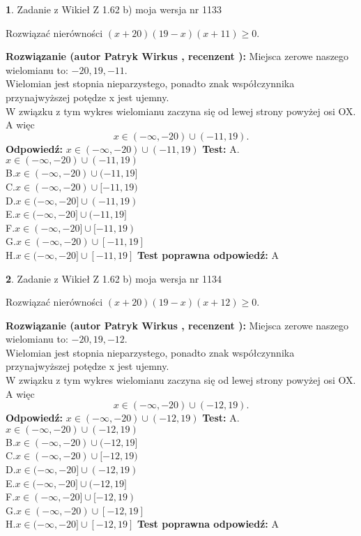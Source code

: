 \documentclass[12pt, a4paper]{article}
\theoremstyle{definition} %
\newtheorem{zad}{}
\newcommand{\zadStart}[1]{\begin{zad}#1\newline}
\newcommand{\zadStop}{\end{zad}}
\newcommand{\rozwStart}[2]{\noindent \textbf{Rozwiązanie (autor #1 , recenzent #2): }\newline}
\newcommand{\rozwStop}{\newline}
\newcommand{\odpStart}{\noindent \textbf{Odpowiedź:}\newline}
\newcommand{\odpStop}{\newline}
\newcommand{\testStart}{\noindent \textbf{Test:}\newline}
\newcommand{\testStop}{\newline}
\newcommand{\kluczStart}{\noindent \textbf{Test poprawna odpowiedź:}\newline}
\newcommand{\kluczStop}{\newline}
\begin{document}
\zadStart{Zadanie z Wikieł Z 1.62 b) moja wersja nr 1133}

Rozwiązać nierówności $(x+20)(19-x)(x+11)\ge0$.
\zadStop
\rozwStart{Patryk Wirkus}{}
Miejsca zerowe naszego wielomianu to: $-20, 19, -11$.\\
Wielomian jest stopnia nieparzystego, ponadto znak współczynnika przy\linebreak najwyższej potędze x jest ujemny.\\ W związku z tym wykres wielomianu zaczyna się od lewej strony powyżej osi OX. A więc $$x \in (-\infty,-20) \cup (-11,19).$$
\rozwStop
\odpStart
$x \in (-\infty,-20) \cup (-11,19)$
\odpStop
\testStart
A.$x \in (-\infty,-20) \cup (-11,19)$\\
B.$x \in (-\infty,-20) \cup (-11,19]$\\
C.$x \in (-\infty,-20) \cup [-11,19)$\\
D.$x \in (-\infty,-20] \cup (-11,19)$\\
E.$x \in (-\infty,-20] \cup (-11,19]$\\
F.$x \in (-\infty,-20] \cup [-11,19)$\\
G.$x \in (-\infty,-20) \cup [-11,19]$\\
H.$x \in (-\infty,-20] \cup [-11,19]$
\testStop
\kluczStart
A
\kluczStop



\zadStart{Zadanie z Wikieł Z 1.62 b) moja wersja nr 1134}

Rozwiązać nierówności $(x+20)(19-x)(x+12)\ge0$.
\zadStop
\rozwStart{Patryk Wirkus}{}
Miejsca zerowe naszego wielomianu to: $-20, 19, -12$.\\
Wielomian jest stopnia nieparzystego, ponadto znak współczynnika przy\linebreak najwyższej potędze x jest ujemny.\\ W związku z tym wykres wielomianu zaczyna się od lewej strony powyżej osi OX. A więc $$x \in (-\infty,-20) \cup (-12,19).$$
\rozwStop
\odpStart
$x \in (-\infty,-20) \cup (-12,19)$
\odpStop
\testStart
A.$x \in (-\infty,-20) \cup (-12,19)$\\
B.$x \in (-\infty,-20) \cup (-12,19]$\\
C.$x \in (-\infty,-20) \cup [-12,19)$\\
D.$x \in (-\infty,-20] \cup (-12,19)$\\
E.$x \in (-\infty,-20] \cup (-12,19]$\\
F.$x \in (-\infty,-20] \cup [-12,19)$\\
G.$x \in (-\infty,-20) \cup [-12,19]$\\
H.$x \in (-\infty,-20] \cup [-12,19]$
\testStop
\kluczStart
A
\kluczStop
\end{document}
